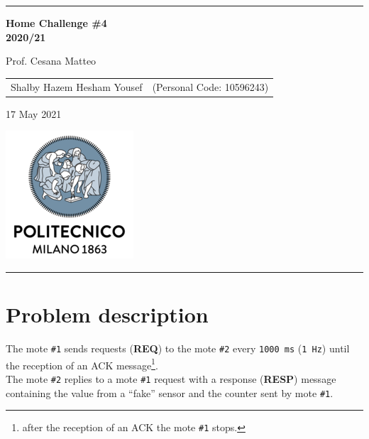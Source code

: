 \documentclass{article}
\begin{document}
\setlength\parindent{0pt} %
\setlength\parskip{1em}

\begin{titlepage}
	\centering
	\hrule
	
	\vspace{6,5cm}
	{\Huge \textbf{Home Challenge \#4\\
		2020/21}\\}
		
		\vspace{0,5cm}
		\large {Prof. Cesana Matteo}
		
		\vspace{2,5cm}
		{
			\large
			\begin{tabular}{c c}
				Shalby Hazem Hesham Yousef & (Personal Code: 10596243) \\
			\end{tabular}
			
		}
		\vspace{4cm}
		
		\normalsize{17 May 2021}
		\vspace{0,2cm}
		
		\centering\hspace{0,2cm}\includegraphics[scale=0.6]{./logo.png}
		\vspace{0,5cm}
		\hrule
		
		\end{titlepage}
		
		\pagebreak
		
		\pagebreak
		
		\section{Problem description} %
		The mote  \texttt{\#1} sends requests (\textbf{REQ}) to the mote \texttt{\#2} every \texttt{1000 ms} (\texttt{1 Hz}) until the reception of an ACK message\footnote{after the reception of an ACK the mote   \texttt{\#1} stops.}.\\
        The mote  \texttt{\#2} replies to a mote  \texttt{\#1} request with a response (\textbf{RESP}) message containing the value from a “fake” sensor and the counter sent by mote \texttt{\#1}.
        
\end{document}
